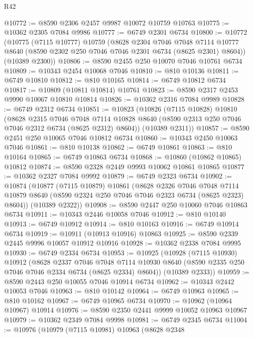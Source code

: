 \begin{lexlean}{R42}
\begin{coremodule}
{@10772 := @8590 @2306 @2457 @9987 @10072 @10759 @10763
@10775 := @10362 @2305 @7084 @9986
@10777 := @6749 @2301 @6734
@10800 := @10772
    (@10775
      (@7115 @10777)
      @10759
      (@8628
        @2304
        @7046
        @7048
        @7114
        @10777
        @8640
        (@8590 @2302 @250 @7046 @7046 @2301 @6734 (@8625 @2301) @8604))
      (@10389 @2300))
@10806 := @8590 @2455 @250 @10070 @7046 @10761 @6734
@10809 := @10343 @2454 @10068 @7046
@10810 := @810 @10136
@10811 := @6749 @10810
@10812 := @810 @10165
@10814 := @6749 @10812 @6734
@10817 := @10809 (@10811 @10814) @10761
@10823 := @8590 @2317 @2453 @9990 @10067 @10810 @10814
@10826 := @10362 @2316 @7084 @9989
@10828 := @6749 @2312 @6734
@10851 := @10823
    (@10826
      (@7115 @10828)
      @10810
      (@8628
        @2315
        @7046
        @7048
        @7114
        @10828
        @8640
        (@8590 @2313 @250 @7046 @7046 @2312 @6734 (@8625 @2312) @8604))
      (@10389 @2311))
@10857 := @8590 @2451 @250 @10065 @7046 @10812 @6734
@10860 := @10343 @2450 @10063 @7046
@10861 := @810 @10138
@10862 := @6749 @10861
@10863 := @810 @10164
@10865 := @6749 @10863 @6734
@10868 := @10860 (@10862 @10865) @10812
@10874 := @8590 @2328 @2449 @9993 @10062 @10861 @10865
@10877 := @10362 @2327 @7084 @9992
@10879 := @6749 @2323 @6734
@10902 := @10874
    (@10877
      (@7115 @10879)
      @10861
      (@8628
        @2326
        @7046
        @7048
        @7114
        @10879
        @8640
        (@8590 @2324 @250 @7046 @7046 @2323 @6734 (@8625 @2323) @8604))
      (@10389 @2322))
@10908 := @8590 @2447 @250 @10060 @7046 @10863 @6734
@10911 := @10343 @2446 @10058 @7046
@10912 := @810 @10140
@10913 := @6749 @10912
@10914 := @810 @10163
@10916 := @6749 @10914 @6734
@10919 := @10911 (@10913 @10916) @10863
@10925 := @8590 @2339 @2445 @9996 @10057 @10912 @10916
@10928 := @10362 @2338 @7084 @9995
@10930 := @6749 @2334 @6734
@10953 := @10925
    (@10928
      (@7115 @10930)
      @10912
      (@8628
        @2337
        @7046
        @7048
        @7114
        @10930
        @8640
        (@8590 @2335 @250 @7046 @7046 @2334 @6734 (@8625 @2334) @8604))
      (@10389 @2333))
@10959 := @8590 @2443 @250 @10055 @7046 @10914 @6734
@10962 := @10343 @2442 @10053 @7046
@10963 := @810 @10142
@10964 := @6749 @10963
@10965 := @810 @10162
@10967 := @6749 @10965 @6734
@10970 := @10962 (@10964 @10967) @10914
@10976 := @8590 @2350 @2441 @9999 @10052 @10963 @10967
@10979 := @10362 @2349 @7084 @9998
@10981 := @6749 @2345 @6734
@11004 := @10976
    (@10979
      (@7115 @10981)
      @10963
      (@8628
        @2348
}
\end{coremodule}
\end{lexlean}
